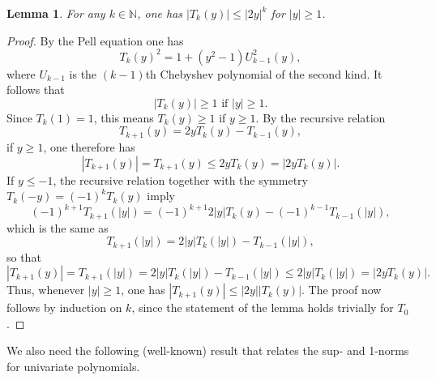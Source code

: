 \documentclass[11pt]{article}
\newcommand{\N}{\mathbb{N}}
\newtheorem{lemma}[defin]{Lemma}
\theoremstyle{definition}
\begin{document}
\begin{lemma}
    For any $k \in \N$, one has $|T_k(y)| \leq |2y|^k$ for $|y|\geq 1$.
\end{lemma}

\begin{proof}
    By the Pell equation one has
\[
T_k(y)^2 = 1+ (y^2-1)U^2_{k-1}(y),
\]
where $U_{k-1}$ is the $(k-1)$th Chebyshev polynomial of the second kind. It follows that
\[
|T_k(y)| \ge 1 \mbox{ if } |y| \geq 1.
\]
Since $T_k(1)=1$, this means $T_k(y) \ge 1$ if $y \ge 1$.
By the recursive relation
\[
T_{k+1}(y) = 2yT_k(y) - T_{k-1}(y),
\]
if $y\geq 1$, one therefore  has
\[
    |T_{k+1}(y)| = T_{k+1}(y)\le 2yT_k(y) = |2yT_k(y)|.
\]
If $y \le -1$, the recursive relation together with the symmetry $T_k(-y) = (-1)^kT_k(y)$ imply
\[
(-1)^{k+1}T_{k+1}(|y|) = (-1)^{k+1}2|y|T_k(y) - (-1)^{k-1}T_{k-1}(|y|),
\]
which is the same as
\[
T_{k+1}(|y|) = 2|y|T_k(|y|) - T_{k-1}(|y|),
\]
so that
\[
|T_{k+1}(y)| = T_{k+1}(|y|) = 2|y|T_k(|y|) - T_{k-1}(|y|) \le 2|y|T_k(|y|) = |2yT_k(y)|.
\]
Thus, whenever $|y| \ge 1$, one has $|T_{k+1}(y)| \le |2y||T_k(y)|$.
The proof now follows by induction on $k$, since the statement of the lemma holds trivially for $T_0$.
\end{proof}


We also need the following (well-known) result that relates the sup- and 1-norms for univariate polynomials.
\end{document}
